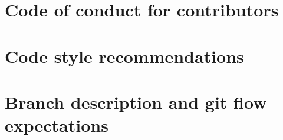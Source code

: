 
\section{Code of conduct for contributors}
\section{Code style recommendations}
\section{Branch description and git flow expectations}
